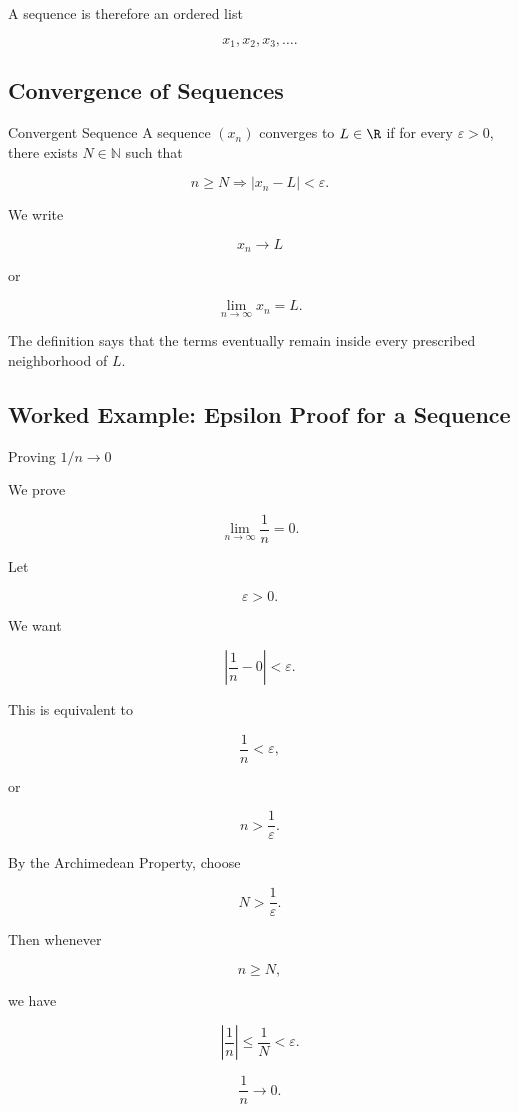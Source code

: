 A sequence is therefore an ordered list

\[
x_1,x_2,x_3,\ldots.
\]

\subsection{Convergence of Sequences}
\label{subsec:sequence-convergence-rigorous}

\begin{definitionbox}{Convergent Sequence}
A sequence \((x_n)\) converges to \(L\in\R\) if for every
\(\varepsilon>0\), there exists \(N\in\mathbb{N}\) such that

\[
\boxed{
n\geq N
\Longrightarrow
|x_n-L|<\varepsilon.
}
\]

We write

\[
\boxed{
x_n\to L
}
\]

or

\[
\boxed{
\lim_{n\to\infty}x_n=L.
}
\]
\end{definitionbox}

The definition says that the terms eventually remain inside every
prescribed neighborhood of \(L\).

\subsection{Worked Example: Epsilon Proof for a Sequence}
\label{subsec:worked-epsilon-sequence}

\begin{workedexamplebox}{Proving \(1/n\to0\)}

We prove

\[
\lim_{n\to\infty}\frac1n=0.
\]

Let

\[
\varepsilon>0.
\]

We want

\[
\left|
\frac1n-0
\right|
<
\varepsilon.
\]

This is equivalent to

\[
\frac1n<\varepsilon,
\]

or

\[
n>\frac1\varepsilon.
\]

By the Archimedean Property, choose

\[
N>\frac1\varepsilon.
\]

Then whenever

\[
n\geq N,
\]

we have

\[
\left|
\frac1n
\right|
\leq
\frac1N
<
\varepsilon.
\]

\begin{answerbox}
\[
\boxed{
\frac1n\to0.
}
\]
\end{answerbox}
\end{workedexamplebox}

